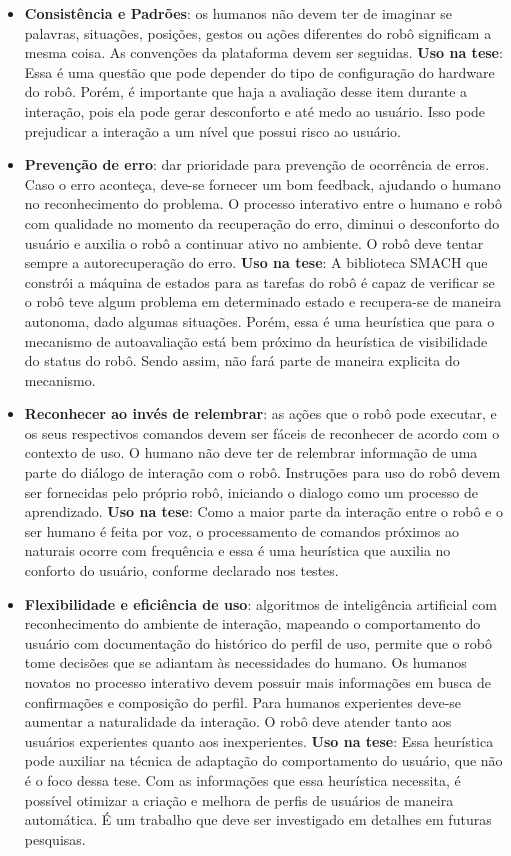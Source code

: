 \begin{itemize}
	\item \textbf{Consistência e Padrões}: os humanos não devem ter de imaginar se palavras, situações, posições, gestos ou ações diferentes do robô significam a mesma coisa. As convenções da plataforma devem ser seguidas. \textbf{Uso na tese}: Essa é uma questão que pode depender do tipo de configuração do hardware do robô. Porém, é importante que haja a avaliação desse item durante a interação, pois ela pode gerar desconforto e até medo ao usuário. Isso pode prejudicar a interação a um nível que possui risco ao usuário.
	\item \textbf{Prevenção de erro}: dar prioridade para prevenção de ocorrência de erros. Caso o erro aconteça, deve-se fornecer um bom feedback, ajudando o humano no reconhecimento do problema. O processo interativo entre o humano e robô com qualidade no momento da recuperação do erro, diminui o desconforto do usuário e auxilia o robô a continuar ativo no ambiente. O robô deve tentar sempre a autorecuperação do erro. \textbf{Uso na tese}: A biblioteca SMACH que constrói a máquina de estados para as tarefas do robô é capaz de verificar se o robô teve algum problema em determinado estado e recupera-se de maneira autonoma, dado algumas situações. Porém, essa é uma heurística que para o mecanismo de autoavaliação está bem próximo da heurística de visibilidade do status do robô. Sendo assim, não fará parte de maneira explicita do mecanismo.
	\item \textbf{Reconhecer ao invés de relembrar}: as ações que o robô pode executar, e os seus respectivos comandos devem ser fáceis de reconhecer de acordo com o contexto de uso. O humano não deve ter de relembrar informação de uma parte do diálogo de interação com o robô. Instruções para uso do robô devem ser fornecidas pelo próprio robô, iniciando o dialogo como um processo de aprendizado. \textbf{Uso na tese}: Como a maior parte da interação entre o robô e o ser humano é feita por voz, o processamento de comandos próximos ao naturais ocorre com frequência e essa é uma heurística que auxilia no conforto do usuário, conforme declarado nos testes.
	\item \textbf{Flexibilidade e eficiência de uso}: algoritmos de inteligência artificial com reconhecimento do ambiente de interação, mapeando o comportamento do usuário com documentação do histórico do perfil de uso, permite que o robô tome decisões que se adiantam às necessidades do humano. Os humanos novatos no processo interativo devem possuir mais informações em busca de confirmações e composição do perfil. Para humanos experientes deve-se aumentar a naturalidade da interação. O robô deve atender tanto aos usuários experientes quanto aos inexperientes. \textbf{Uso na tese}: Essa heurística pode auxiliar na técnica de adaptação do comportamento do usuário, que não é o foco dessa tese. Com as informações que essa heurística necessita, é possível otimizar a criação e melhora de perfis de usuários de maneira automática. É um trabalho que deve ser investigado em detalhes em futuras pesquisas.

\end{itemize}
